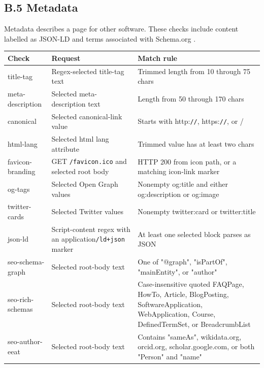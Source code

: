 \documentclass{article}
\begin{document}
\subsection*{B.5 Metadata}

Metadata describes a page for other software. These checks include content labelled as JSON-LD \cite{ref18} and terms associated with Schema.org \cite{ref19}.

\begingroup
\footnotesize
\setlength{\tabcolsep}{3pt}
\setlength{\LTleft}{0pt}
\setlength{\LTright}{0pt plus 1fill}
\begin{longtable}{>{\raggedright\arraybackslash}p{}>{\raggedright\arraybackslash}p{}>{\raggedright\arraybackslash}p{}}
\toprule
\textbf{Check} & \textbf{Request} & \textbf{Match rule} \\
\midrule
\endhead
title-tag & Regex-selected title-tag text & Trimmed length from 10 through 75 chars \\
meta-description & Selected meta-description text & Length from 50 through 170 chars \\
canonical & Selected canonical-link value & Starts with http:\nolinkurl{//}, https:\nolinkurl{//}, or / \\
html-lang & Selected html lang attribute & Trimmed value has at least two chars \\
favicon-branding & GET \nolinkurl{/favicon.ico} and selected root body & HTTP 200 from icon path, or a matching icon-link marker \\
og-tags & Selected Open Graph values & Nonempty og:title and either og:description or og:image \\
twitter-cards & Selected Twitter values & Nonempty twitter:card or twitter:title \\
json-ld & Script-content regex with an application\nolinkurl{/ld+json} marker & At least one selected block parses as JSON \\
seo-schema-graph & Selected root-body text & One of "@graph", "isPartOf", "mainEntity", or "author" \\
seo-rich-schemas & Selected root-body text & Case-insensitive quoted FAQPage, HowTo, Article, BlogPosting, SoftwareApplication, WebApplication, Course, DefinedTermSet, or BreadcrumbList \\
seo-author-eeat & Selected root-body text & Contains "sameAs", wikidata.org, orcid.org, scholar.google.com, or both "Person" and "name" \\

\end{longtable}
\end{document}
